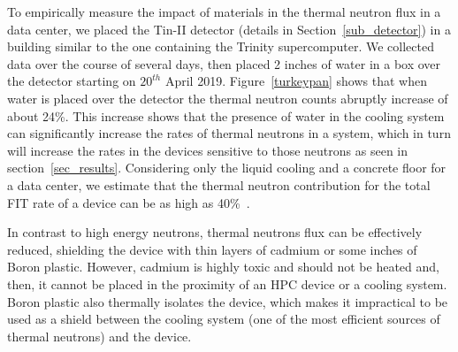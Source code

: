To  empirically measure the impact of materials in the thermal neutron flux in a data center, we placed the Tin-II detector (details in Section~\ref{sub_detector}) in a building similar to the one containing the Trinity supercomputer. We collected data over the course of several days, then placed 2 inches of water in a box over the detector starting on $20^{th}$ April 2019. Figure~\ref{turkeypan} shows that when water is placed over the detector the thermal neutron counts abruptly increase of about 24\%. This increase shows that the presence of water in the cooling system can significantly increase the rates of thermal neutrons in a system, which in turn will increase the rates in the devices sensitive to those neutrons as seen in section~\ref{sec_results}. Considering only the liquid cooling and a concrete floor for a data center, we estimate that the thermal neutron contribution for the total FIT rate of a device can be as high as 40\%~\cite{jsc2020}.

In contrast to high energy neutrons, thermal neutrons flux can be effectively reduced, shielding the device with thin layers of cadmium or some inches of Boron plastic. However, cadmium is highly toxic and should not be heated and, then, it cannot be placed in the proximity of an HPC device or a cooling system. Boron plastic also thermally isolates the device, which makes it impractical to be used as a shield between the cooling system (one of the most efficient sources of thermal neutrons) and the device.


